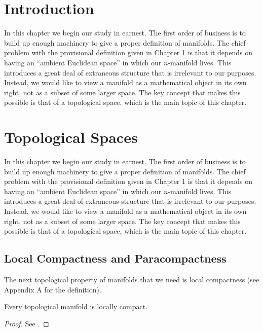 \documentclass[12pt, ThmSectionNumbering]{CrispyNotes}
\begin{document}
\hypertarget{bm:Introduction}{\section*{Introduction}}

In this chapter we begin our study in earnest. The first order of business is to build up enough machinery to give a proper definition of manifolds. The chief problem with the provisional definition given in Chapter 1 is that it depends on having an \enquote{ambient Euclidean space} in which our $n$-manifold lives. This introduces a great deal of extraneous structure that is irrelevant to our purposes. Instead, we would like to view a manifold as a mathematical object in its own right, not as a subset of some larger space. The key concept that makes this possible is that of a topological space, which is the main topic of this chapter.

\section{Topological Spaces}


In this chapter we begin our study in earnest. The first order of business is to build up enough machinery to give a proper definition of manifolds. The chief problem with the provisional definition given in Chapter 1 is that it depends on having an \enquote{ambient Euclidean space} in which our $n$-manifold lives. This introduces a great deal of extraneous structure that is irrelevant to our purposes. Instead, we would like to view a manifold as a mathematical object in its own right, not as a subset of some larger space. The key concept that makes this possible is that of a topological space, which is the main topic of this chapter.

\subsection{Local Compactness and Paracompactness}

The next topological property of manifolds that we need is local compactness (see Appendix A for the definition).
\begin{proposition}\label{prop1}
    Every topological manifold is locally compact.
\end{proposition}
\begin{proof}
    See \cite[47]{leeIntroductionSmoothManifolds2013}.
\end{proof}
\end{document}
